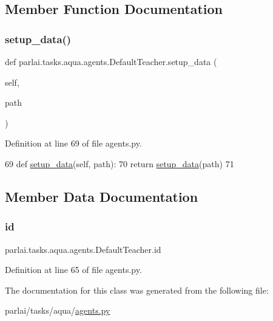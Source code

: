 \subsection{Member Function Documentation}
\mbox{\label{classparlai_1_1tasks_1_1aqua_1_1agents_1_1DefaultTeacher_a928d2d0ad6804660ca863b2221f53b8e}} 
\subsubsection{\texorpdfstring{setup\+\_\+data()}{setup\_data()}}
{\footnotesize\ttfamily def parlai.\+tasks.\+aqua.\+agents.\+Default\+Teacher.\+setup\+\_\+data (\begin{DoxyParamCaption}\item[{}]{self,  }\item[{}]{path }\end{DoxyParamCaption})}



Definition at line 69 of file agents.\+py.


\begin{DoxyCode}
69     \textcolor{keyword}{def }\hyperlink{namespaceparlai_1_1tasks_1_1multinli_1_1agents_a4fa2cb0ba1ed745336ad8bceed36b841}{setup\_data}(self, path):
70         \textcolor{keywordflow}{return} \hyperlink{namespaceparlai_1_1tasks_1_1multinli_1_1agents_a4fa2cb0ba1ed745336ad8bceed36b841}{setup\_data}(path)
71 \end{DoxyCode}


\subsection{Member Data Documentation}
\mbox{\label{classparlai_1_1tasks_1_1aqua_1_1agents_1_1DefaultTeacher_a7f24ae016e64a6b1b6c091598b204897}} 
\subsubsection{\texorpdfstring{id}{id}}
{\footnotesize\ttfamily parlai.\+tasks.\+aqua.\+agents.\+Default\+Teacher.\+id}



Definition at line 65 of file agents.\+py.



The documentation for this class was generated from the following file\+:\begin{DoxyCompactItemize}
\item 
parlai/tasks/aqua/\hyperlink{parlai_2tasks_2aqua_2agents_8py}{agents.\+py}\end{DoxyCompactItemize}
